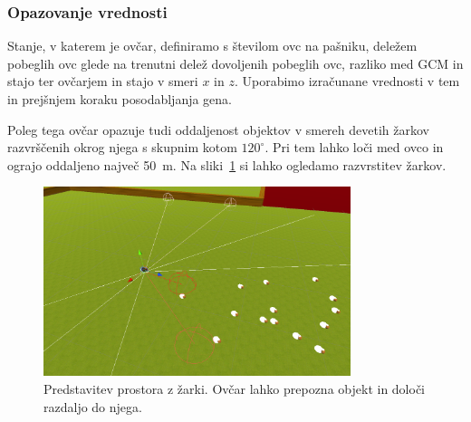 \subsubsection{Opazovanje vrednosti}

Stanje, v katerem je ovčar, definiramo s številom ovc na pašniku, deležem pobeglih ovc glede na trenutni delež dovoljenih pobeglih ovc, razliko med GCM in stajo ter ovčarjem in stajo v smeri $x$ in $z$. Uporabimo izračunane vrednosti v tem in prejšnjem koraku posodabljanja gena.

Poleg tega ovčar opazuje tudi oddaljenost objektov v smereh devetih žarkov razvrščenih okrog njega s skupnim kotom $120^\circ$. Pri tem lahko loči med ovco in ograjo oddaljeno največ 50~m. Na sliki~\ref{fig:zarki} si lahko ogledamo razvrstitev žarkov.

\begin{figure}[ht]  %
	\centering
	\includegraphics[width=0.8\textwidth]{../poglavja/images/zarki.png}
	\caption[Predstavitev prostora z žarki]{Predstavitev prostora z žarki. Ovčar lahko prepozna objekt in določi razdaljo do njega.} %
	\label{fig:zarki}
\end{figure}

